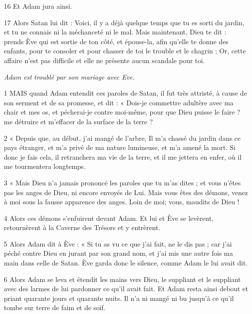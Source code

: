 \par 16 Et Adam jura ainsi.

\par 17 Alors Satan lui dit : Voici, il y a déjà quelque temps que tu es sorti du jardin, et tu ne connais ni la méchanceté ni le mal. Mais maintenant, Dieu te dit : prends Ève qui est sortie de ton côté, et épouse-la, afin qu'elle te donne des enfants, pour te consoler et pour chasser de toi le trouble et le chagrin ; Or, cette affaire n’est pas difficile et elle ne présente aucun scandale pour toi.


\par \textit{Adam est troublé par son mariage avec Eve.}

\par 1 MAIS quand Adam entendit ces paroles de Satan, il fut très attristé, à cause de son serment et de sa promesse, et dit : « Dois-je commettre adultère avec ma chair et mes os, et pécherai-je contre moi-même, pour que Dieu puisse le faire ? me détruire et m'effacer de la surface de la terre ?

\par 2 « Depuis que, au début, j'ai mangé de l'arbre, Il m'a chassé du jardin dans ce pays étranger, et m'a privé de ma nature lumineuse, et m'a amené la mort. Si donc je fais cela, il retranchera ma vie de la terre, et il me jettera en enfer, où il me tourmentera longtemps.

\par 3 « Mais Dieu n'a jamais prononcé les paroles que tu m'as dites ; et vous n'êtes pas les anges de Dieu, ni encore envoyés de Lui. Mais vous êtes des démons, venez à moi sous la fausse apparence des anges. Loin de moi; vous, maudits de Dieu !

\par 4 Alors ces démons s'enfuirent devant Adam. Et lui et Ève se levèrent, retournèrent à la Caverne des Trésors et y entrèrent.

\par 5 Alors Adam dit à Ève : « Si tu as vu ce que j'ai fait, ne le dis pas ; car j’ai péché contre Dieu en jurant par son grand nom, et j’ai mis une autre fois ma main dans celle de Satan. Ève garda donc le silence, comme Adam le lui avait dit.

\par 6 Alors Adam se leva et étendit les mains vers Dieu, le suppliant et le suppliant avec des larmes de lui pardonner ce qu'il avait fait. Et Adam resta ainsi debout et priant quarante jours et quarante nuits. Il n'a ni mangé ni bu jusqu'à ce qu'il tombe sur terre de faim et de soif.

